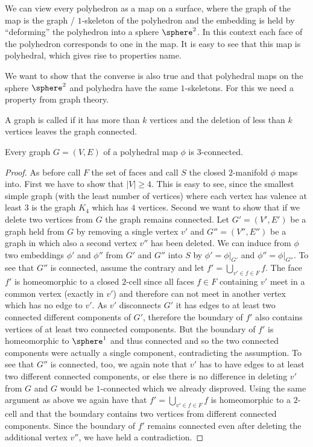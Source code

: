 \begin{remark}\label{rem:polymap:from:polyhedron}
  We can view every polyhedron as a map on a surface, where the graph of the map is the graph / $1$-skeleton of the polyhedron and the embedding is held by ``deforming'' the polyhedron into a sphere $\sphere^2$. In this context each face of the polyhedron corresponds to one in the map. It is easy to see that this map is polyhedral, which gives rise to properties name.
\end{remark}

We want to show that the converse is also true and that polyhedral maps on the sphere $\sphere^2$ and polyhedra have the same $1$-skeletons. For this we need a property from graph theory.

\begin{definition} A graph is called  if it has more than $k$ vertices and the deletion of less than $k$ vertices leaves the graph connected.
\end{definition}

\begin{proposition} Every graph $G = (V, E)$ of a polyhedral map $\phi$  is $3$-connected.
  \begin{proof}
    As before call $F$ the set of faces and call $S$ the closed $2$-manifold $\phi$ maps into. First we have to show that $|V| \geq 4$. This is easy to see, since the smallest simple graph (with the least number of vertices) where each vertex has valence at least $3$ is the graph $K_4$ which has $4$ vertices. Second we want to show that if we delete two vertices from $G$ the graph remains connected. Let $G' = (V', E')$ be a graph held from $G$ by removing a single vertex $v'$ and $G'' = (V'', E'')$ be a graph in which also a second vertex $v''$ has been deleted. We can induce from $\phi$ two embeddings $\phi'$ and $\phi''$ from $G'$ and $G''$ into $S$ by $\phi' = \phi|_{G'}$ and $\phi'' = \phi|_{G''}$. To see that $G''$ is connected, assume the contrary and let $f' = \bigcup_{v' \in f \in F} f$. The face $f'$ is homeomorphic to a closed $2$-cell since all faces $f \in F$ containing $v'$ meet in a common vertex (exactly in $v'$) and therefore can not meet in another vertex which has no edge to $v'$. As $v'$ disconnects $G'$ it has edges to at least two connected different components of $G'$, therefore the boundary of $f'$ also contains vertices of at least two connected components. But the boundary of $f'$ is homeomorphic to $\sphere^1$ and thus connected and so the two connected components were actually a single component, contradicting the assumption. To see that $G''$ is connected, too, we again note that $v'$ has to have edges to at least two different connected components, or else there is no difference in deleting $v'$ from $G$ and $G$ would be $1$-connected which we already disproved. Using the same argument as above we again have that $f' = \bigcup_{v' \in f \in F} f$ is homeomorphic to a $2$-cell and that the boundary contains two vertices from different connected components. Since the boundary of $f'$ remains connected even after deleting the additional vertex $v''$, we have held a contradiction.
  \end{proof}
\end{proposition}

